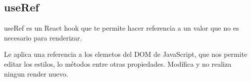 \subsection{useRef}

useRef es un React hook que te permite hacer referencia a un valor que no es necesario para renderizar.

Le aplica una referencia a los elemetos del DOM de JavaScript, que nos permite editar los estilos, lo m\'etodos entre otras propiedades.
Mod\'ifica y no realiza ningun render nuevo.

